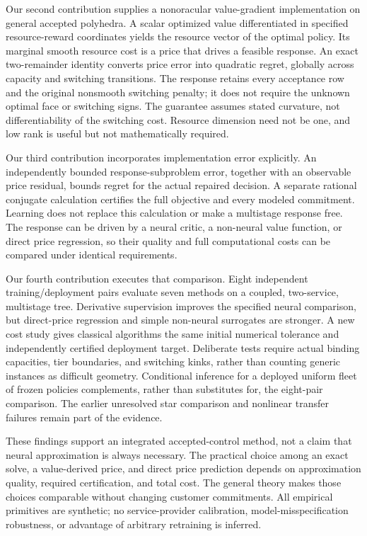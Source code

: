 \documentclass[11pt,letterpaper]{article}
\theoremstyle{definition}
\newcommand{\1}{\mathbf 1}
\begin{document}
Our second contribution supplies a nonoracular value-gradient implementation on general accepted polyhedra. A scalar optimized value differentiated in specified resource-reward coordinates yields the resource vector of the optimal policy. Its marginal smooth resource cost is a price that drives a feasible response. An exact two-remainder identity converts price error into quadratic regret, globally across capacity and switching transitions. The response retains every acceptance row and the original nonsmooth switching penalty; it does not require the unknown optimal face or switching signs. The guarantee assumes stated curvature, not differentiability of the switching cost. Resource dimension need not be one, and low rank is useful but not mathematically required.

Our third contribution incorporates implementation error explicitly. An independently bounded response-subproblem error, together with an observable price residual, bounds regret for the actual repaired decision. A separate rational conjugate calculation certifies the full objective and every modeled commitment. Learning does not replace this calculation or make a multistage response free. The response can be driven by a neural critic, a non-neural value function, or direct price regression, so their quality and full computational costs can be compared under identical requirements.

Our fourth contribution executes that comparison. Eight independent training/deployment pairs evaluate seven methods on a coupled, two-service, multistage tree. Derivative supervision improves the specified neural comparison, but direct-price regression and simple non-neural surrogates are stronger. A new cost study gives classical algorithms the same initial numerical tolerance and independently certified deployment target. Deliberate tests require actual binding capacities, tier boundaries, and switching kinks, rather than counting generic instances as difficult geometry. Conditional inference for a deployed uniform fleet of frozen policies complements, rather than substitutes for, the eight-pair comparison. The earlier unresolved star comparison and nonlinear transfer failures remain part of the evidence.

These findings support an integrated accepted-control method, not a claim that neural approximation is always necessary. The practical choice among an exact solve, a value-derived price, and direct price prediction depends on approximation quality, required certification, and total cost. The general theory makes those choices comparable without changing customer commitments. All empirical primitives are synthetic; no service-provider calibration, model-misspecification robustness, or advantage of arbitrary retraining is inferred.
\end{document}
